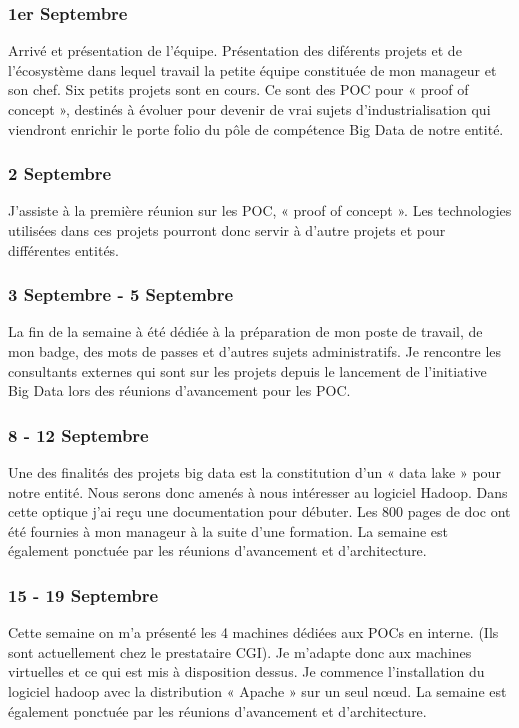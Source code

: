\subsubsection*{1er Septembre}
Arrivé et présentation de l'équipe. Présentation des diférents projets et de l’écosystème dans lequel travail la petite équipe constituée de mon manageur et son chef. Six petits projets sont en cours. Ce sont des POC pour « proof of concept », destinés à évoluer pour devenir de vrai sujets d’industrialisation qui viendront enrichir le porte folio du pôle de compétence Big Data de notre entité. 
\subsubsection*{2 Septembre}
J’assiste à la première réunion sur  les POC, « proof of concept ». Les technologies utilisées dans ces projets pourront donc servir à d’autre projets et pour différentes entités.
\subsubsection*{3 Septembre  -  5 Septembre}
La fin de la semaine à été dédiée à la préparation de mon poste de travail, de mon badge, des mots de passes et d’autres sujets administratifs. Je rencontre les consultants externes qui sont sur les projets depuis le lancement de l’initiative Big Data lors des réunions d’avancement pour les POC.
\subsubsection*{8 - 12 Septembre}
Une des finalités des projets big data est la constitution d’un « data lake » pour notre entité. Nous serons donc amenés à nous intéresser au logiciel Hadoop. Dans cette optique j’ai reçu une documentation pour débuter. Les 800 pages de doc ont été fournies à mon manageur à la suite d’une formation. La semaine est également ponctuée par les réunions d’avancement et d’architecture.
\subsubsection*{15 - 19 Septembre}
Cette semaine on m’a présenté les 4 machines dédiées aux POCs en interne. (Ils sont actuellement chez le prestataire CGI). Je m’adapte donc aux machines virtuelles et ce qui est mis à disposition dessus. Je commence l’installation du logiciel hadoop avec la distribution « Apache » sur un seul nœud. La semaine est également ponctuée par les réunions d’avancement et d’architecture.
